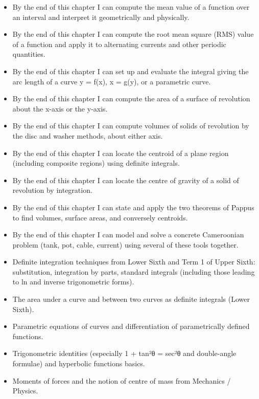 \documentclass[11pt]{article}
\begin{document}
\begin{objectifs}
\begin{itemize}
\item By the end of this chapter I can compute the mean value of a function over an interval and interpret it geometrically and physically.
\item By the end of this chapter I can compute the root mean square (RMS) value of a function and apply it to alternating currents and other periodic quantities.
\item By the end of this chapter I can set up and evaluate the integral giving the arc length of a curve y = f(x), x = g(y), or a parametric curve.
\item By the end of this chapter I can compute the area of a surface of revolution about the x-axis or the y-axis.
\item By the end of this chapter I can compute volumes of solids of revolution by the disc and washer methods, about either axis.
\item By the end of this chapter I can locate the centroid of a plane region (including composite regions) using definite integrals.
\item By the end of this chapter I can locate the centre of gravity of a solid of revolution by integration.
\item By the end of this chapter I can state and apply the two theorems of Pappus to find volumes, surface areas, and conversely centroids.
\item By the end of this chapter I can model and solve a concrete Cameroonian problem (tank, pot, cable, current) using several of these tools together.
\end{itemize}
\end{objectifs}

\begin{prerequis}
\begin{itemize}
\item Definite integration techniques from Lower Sixth and Term 1 of Upper Sixth: substitution, integration by parts, standard integrals (including those leading to ln and inverse trigonometric forms).
\item The area under a curve and between two curves as definite integrals (Lower Sixth).
\item Parametric equations of curves and differentiation of parametrically defined functions.
\item Trigonometric identities (especially 1 + tan²θ = sec²θ and double-angle formulae) and hyperbolic functions basics.
\item Moments of forces and the notion of centre of mass from Mechanics / Physics.
\end{itemize}
\end{prerequis}
\end{document}
